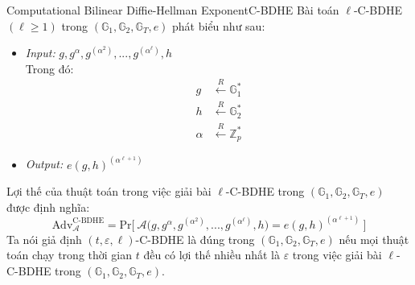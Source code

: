 \documentclass[class=report, crop=false]{standalone}
\begin{document}
		\newpage
		\begin{problem}{Computational Bilinear Diffie-Hellman Exponent}{C-BDHE}
			Bài toán $\ell$-C-BDHE $(\ell \geq 1)$ trong $(\mathbb{G}_1, \mathbb{G}_2, \mathbb{G}_T, e)$ phát biểu như sau:
			\vspace{-\baselineskip}
			\begin{itemize}[leftmargin=1.5cm, itemindent=-0.5cm]
				\item[] \textit{Input:} $g, g^\alpha, g^{(\alpha^2)}, ..., g^{(\alpha^\ell)}, h$ \\
				Trong đó: \vspace{-\baselineskip}
				\begin{align*}
					g 		&\xleftarrow{R} \mathbb{G}_1^* \\
					h 		&\xleftarrow{R} \mathbb{G}_2^* \\
					\alpha 	&\xleftarrow{R} \mathbb{Z}_p^*
				\end{align*}
				\item[] \textit{Output:} $e(g, h)^{(\alpha^{\ell + 1})}$
			\end{itemize}
			\vspace{-\baselineskip}\par
			Lợi thế của thuật toán \algo trong việc giải bài $\ell$-C-BDHE trong $(\mathbb{G}_1, \mathbb{G}_2, \mathbb{G}_T, e)$ được định nghĩa:
			\[
				\text{Adv}_{\mathcal{A}}^{\text{C-BDHE}} = \text{Pr}\bigg[ \ \mathcal{A}\Big(g, g^\alpha, g^{(\alpha^2)}, ..., g^{(\alpha^\ell)}, h \Big) = e(g, h)^{(\alpha^{\ell + 1})} \ \bigg]
			\] \indent
			Ta nói giả định $(t, \varepsilon, \ell)$-C-BDHE là đúng trong $(\mathbb{G}_1, \mathbb{G}_2, \mathbb{G}_T, e)$ nếu mọi thuật toán chạy trong thời gian $t$ đều có lợi thế nhiều nhất là $\varepsilon$ trong việc giải bài $\ell$-C-BDHE trong $(\mathbb{G}_1, \mathbb{G}_2, \mathbb{G}_T, e)$.
		\end{problem}
\end{document}
